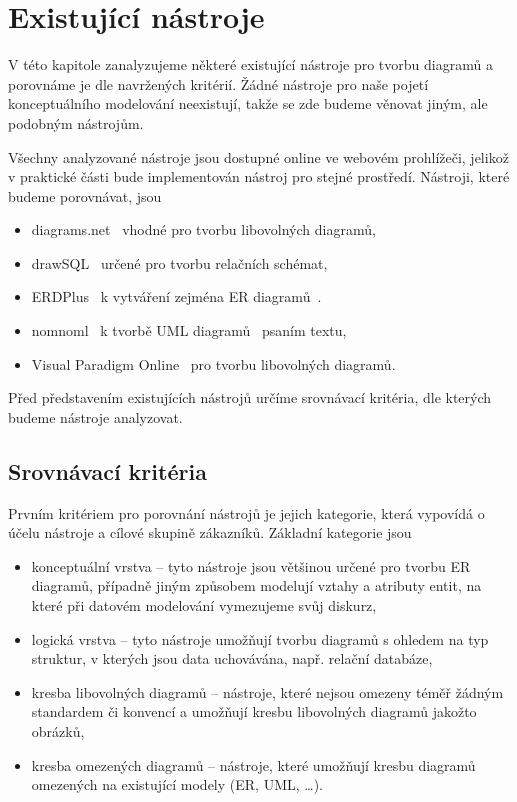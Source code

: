 \chapter{Existující nástroje}\label{chapter:existujici-nastroje}

V této kapitole zanalyzujeme některé existující nástroje pro tvorbu diagramů a porovnáme je dle navržených kritérií.
Žádné nástroje pro naše pojetí konceptuálního modelování neexistují, takže se zde budeme věnovat jiným, ale podobným nástrojům.

Všechny analyzované nástroje jsou dostupné online ve webovém prohlížeči, jelikož v praktické části bude implementován nástroj pro stejné prostředí.
Nástroji, které budeme porovnávat, jsou
\begin{itemize}
  \item diagrams.net~\cite{drawio_2023} vhodné pro tvorbu libovolných diagramů,
  \item drawSQL~\cite{drawsql_2021} určené pro tvorbu relačních schémat,
  \item ERDPlus~\cite{erdplus_2023} k vytváření zejména ER diagramů~\cite{chen_er_1976}.
  \item nomnoml~\cite{nomnoml_2022} k tvorbě UML diagramů~\cite{omg_uml_2017} psaním textu,
  \item Visual Paradigm Online~\cite{vpo_2022} pro tvorbu libovolných diagramů.
\end{itemize}

Před představením existujících nástrojů určíme srovnávací kritéria, dle kterých budeme nástroje analyzovat.

\section{Srovnávací kritéria}

Prvním kritériem pro porovnání nástrojů je jejich kategorie, která vypovídá o účelu nástroje a cílové skupině zákazníků.
Základní kategorie jsou
\begin{itemize}
  \item konceptuální vrstva -- tyto nástroje jsou většinou určené pro tvorbu ER diagramů, případně jiným způsobem modelují vztahy a atributy entit, na které při datovém modelování vymezujeme svůj diskurz,
  \item logická vrstva -- tyto nástroje umožňují tvorbu diagramů s ohledem na typ struktur, v kterých jsou data uchovávána, např. relační databáze,
  \item kresba libovolných diagramů -- nástroje, které nejsou omezeny téměř žádným standardem či konvencí a umožňují kresbu libovolných diagramů jakožto obrázků,
  \item kresba omezených diagramů -- nástroje, které umožňují kresbu diagramů omezených na existující modely (ER, UML, \dots).
\end{itemize}


